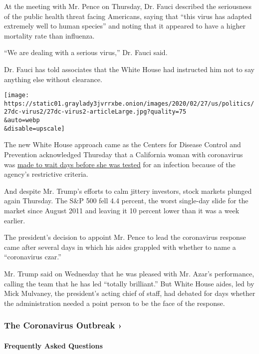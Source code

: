 At the meeting with Mr. Pence on Thursday, Dr. Fauci described the
seriousness of the public health threat facing Americans, saying that
``this virus has adapted extremely well to human species'' and noting
that it appeared to have a higher mortality rate than influenza.

``We are dealing with a serious virus,'' Dr. Fauci said.

Dr. Fauci has told associates that the White House had instructed him
not to say anything else without clearance.

\texttt{[image: https://static01.graylady3jvrrxbe.onion/images/2020/02/27/us/politics/27dc-virus2/27dc-virus2-articleLarge.jpg?quality=75\\\&auto=webp\\\&disable=upscale]}

The new White House approach came as the Centers for Disease Control and
Prevention acknowledged Thursday that a California woman with
coronavirus was
\href{https://www.nytimes3xbfgragh.onion/2020/02/27/health/coronavirus-testing-california.html}{made
to wait days before she was tested} for an infection because of the
agency's restrictive criteria.

And despite Mr. Trump's efforts to calm jittery investors, stock markets
plunged again Thursday. The S\&P 500 fell 4.4 percent, the worst
single-day slide for the market since August 2011 and leaving it 10
percent lower than it was a week earlier.

The president's decision to appoint Mr. Pence to lead the coronavirus
response came after several days in which his aides grappled with
whether to name a ``coronavirus czar.''

Mr. Trump said on Wednesday that he was pleased with Mr. Azar's
performance, calling the team that he has led ``totally brilliant.'' But
White House aides, led by Mick Mulvaney, the president's acting chief of
staff, had debated for days whether the administration needed a point
person to be the face of the response.

\href{https://www.nytimes3xbfgragh.onion/news-event/coronavirus?action=click\&pgtype=Article\&state=default\&region=MAIN_CONTENT_3\&context=storylines_faq}{}

\hypertarget{the-coronavirus-outbreak-}{%
\subsubsection{The Coronavirus Outbreak
›}\label{the-coronavirus-outbreak-}}

\hypertarget{frequently-asked-questions}{%
\paragraph{Frequently Asked
Questions}\label{frequently-asked-questions}}

